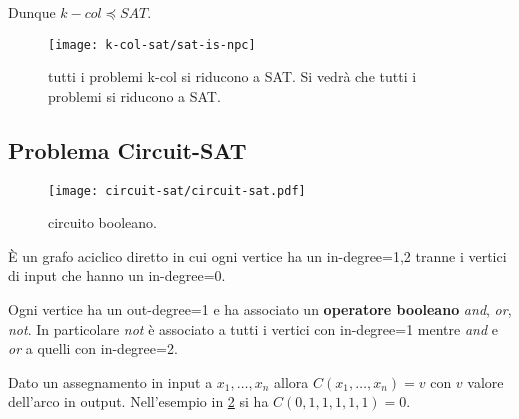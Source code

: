 Dunque $k-col\preceq SAT$.
\begin{figure}[thbp]
	\centering
	\texttt{[image: k-col-sat/sat-is-npc]}
	\caption{tutti i problemi k-col si riducono a SAT. Si vedrà che tutti i problemi si riducono a SAT.}
	\label{fig:sat-is-npc}
\end{figure}
\subsection{Problema Circuit-SAT}
\begin{figure}[thbp]
	\centering
	\texttt{[image: circuit-sat/circuit-sat.pdf]}
	\caption{circuito booleano.}
	\label{fig:circuit-sat}
\end{figure}
\begin{definition}
	È un grafo aciclico diretto in cui ogni vertice ha un in-degree=1,2 tranne i vertici di input che hanno un in-degree=0.
	
	Ogni vertice ha un out-degree=1 e ha associato un \textbf{operatore booleano} \textit{and}, \textit{or}, \textit{not}. In particolare \textit{not} è associato a tutti i vertici con in-degree=1 mentre \textit{and} e \textit{or} a quelli con in-degree=2.
\end{definition}
Dato un assegnamento in input a $x_1,\dots,x_n$ allora $C(x_1,\dots,x_n)=v$ con $v$ valore dell'arco in output. Nell'esempio in \cref{fig:circuit-sat} si ha $C(0,1,1,1,1,1)=0$.
